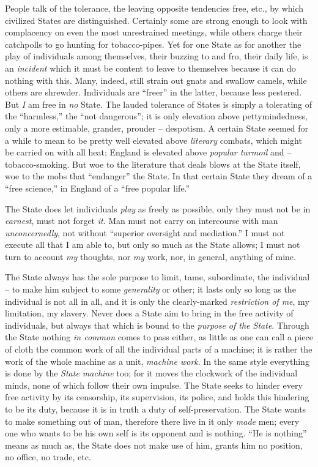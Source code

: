 People talk of the tolerance, the leaving opposite tendencies free, etc., by 
which civilized States are distinguished. Certainly some are strong enough to 
look with complacency on even the most unrestrained meetings, while others 
charge their catchpolls to go hunting for tobacco-pipes. Yet for one State as 
for another the play of individuals among themselves, their buzzing to and 
fro, their daily life, is an \textit{incident} which it must be content to 
leave to themselves because it can do nothing with this. Many, indeed, still 
strain out gnats and swallow camels, while others are shrewder. Individuals 
are ``freer'' in the latter, because less pestered. But \textit{I} am free 
in \textit{no} State. The lauded tolerance of States is simply a tolerating of 
the ``harmless,'' the ``not dangerous''; it is only elevation above 
pettymindedness, only a more estimable, grander, prouder -- despotism. A 
certain State seemed for a while to mean to be pretty well elevated above 
\textit{literary} combats, which might be carried on with all heat; England is 
elevated above \textit{popular turmoil} and -- tobacco-smoking. But woe to the 
literature that deals blows at the State itself, woe to the mobs that 
``endanger'' the State. In that certain State they dream of a ``free 
science,'' in England of a ``free popular life.''

The State does let individuals \textit{play} as freely as possible, only they 
must not be in \textit{earnest}, must not forget \textit{it}. Man must not 
carry on intercourse with man \textit{unconcernedly}, not without ``superior 
oversight and mediation.'' I must not execute all that I am able to, but only 
so much as the State allows; I must not turn to account \textit{my} thoughts, 
nor \textit{my} work, nor, in general, anything of mine.

The State always has the sole purpose to limit, tame, subordinate, the 
individual -- to make him subject to some \textit{generality} or other; it 
lasts only so long as the individual is not all in all, and it is only the 
clearly-marked \textit{restriction of me}, my limitation, my slavery. Never 
does a State aim to bring in the free activity of individuals, but always that 
which is bound to the \textit{purpose of the State}. Through the State nothing 
\textit{in common} comes to pass either, as little as one can call a piece of 
cloth the common work of all the individual parts of a machine; it is rather 
the work of the whole machine as a unit, \textit{machine work}. In the same 
style everything is done by the \textit{State machine} too; for it moves the 
clockwork of the individual minds, none of which follow their own impulse. The 
State seeks to hinder every free activity by its censorship, its supervision, 
its police, and holds this hindering to be its duty, because it is in truth a 
duty of self-preservation. The State wants to make something out of man, 
therefore there live in it only \textit{made} men; every one who wants to be 
his own self is its opponent and is nothing. ``He is nothing'' means as much 
as, the State does not make use of him, grants him no position, no office, no 
trade, etc.


